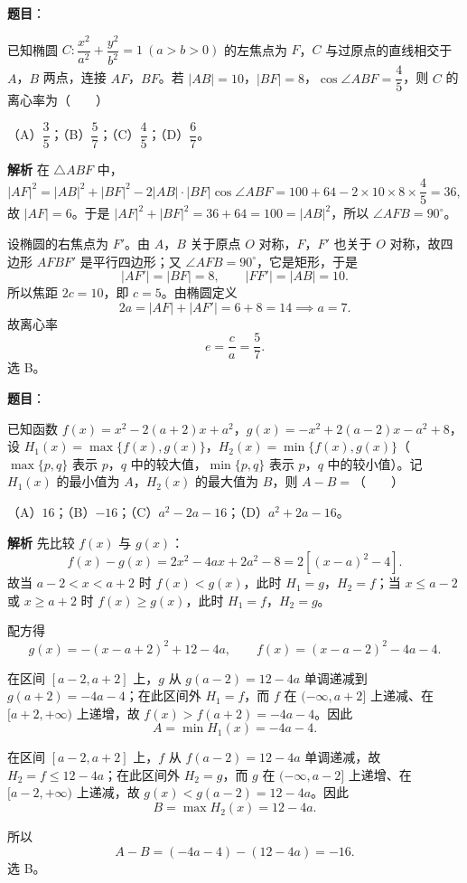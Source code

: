 \begin{answer}

\textbf{题目}：

已知椭圆 $C:\dfrac{x^2}{a^2}+\dfrac{y^2}{b^2}=1\ (a>b>0)$ 的左焦点为 $F$，$C$ 与过原点的直线相交于 $A$，$B$ 两点，连接 $AF$，$BF$。若 $|AB|=10$，$|BF|=8$，$\cos\angle ABF=\dfrac45$，则 $C$ 的离心率为\mbox{（　　）}

（A）$\dfrac35$；（B）$\dfrac57$；（C）$\dfrac45$；（D）$\dfrac67$。

\textbf{解析}
在 $\triangle ABF$ 中，
\nopagebreak[4]
\[|AF|^2=|AB|^2+|BF|^2-2|AB|\cdot|BF|\cos\angle ABF
=100+64-2\times10\times8\times\frac45=36,\]
故 $|AF|=6$。于是 $|AF|^2+|BF|^2=36+64=100=|AB|^2$，所以 $\angle AFB=90^\circ$。

设椭圆的右焦点为 $F'$。由 $A$，$B$ 关于原点 $O$ 对称，$F$，$F'$ 也关于 $O$ 对称，故四边形 $AFBF'$ 是平行四边形；又 $\angle AFB=90^\circ$，它是矩形，于是
\nopagebreak[4]
\[|AF'|=|BF|=8,\qquad |FF'|=|AB|=10.\]
所以焦距 $2c=10$，即 $c=5$。由椭圆定义
\nopagebreak[4]
\[2a=|AF|+|AF'|=6+8=14\implies a=7.\]
故离心率
\nopagebreak[4]
\[e=\frac ca=\frac57.\]
选 B。


\end{answer}
\begin{answer}

\textbf{题目}：

已知函数 $f(x)=x^2-2(a+2)x+a^2$，$g(x)=-x^2+2(a-2)x-a^2+8$，设 $H_1(x)=\max\{f(x),g(x)\}$，$H_2(x)=\min\{f(x),g(x)\}$（$\max\{p,q\}$ 表示 $p$，$q$ 中的较大值，$\min\{p,q\}$ 表示 $p$，$q$ 中的较小值）。记 $H_1(x)$ 的最小值为 $A$，$H_2(x)$ 的最大值为 $B$，则 $A-B=$\mbox{（　　）}

（A）$16$；（B）$-16$；（C）$a^2-2a-16$；（D）$a^2+2a-16$。

\textbf{解析}
先比较 $f(x)$ 与 $g(x)$：
\nopagebreak[4]
\[f(x)-g(x)=2x^2-4ax+2a^2-8=2\left[(x-a)^2-4\right].\]
故当 $a-2<x<a+2$ 时 $f(x)<g(x)$，此时 $H_1=g$，$H_2=f$；当 $x\leqslant a-2$ 或 $x\geqslant a+2$ 时 $f(x)\geqslant g(x)$，此时 $H_1=f$，$H_2=g$。

配方得
\nopagebreak[4]
\[g(x)=-(x-a+2)^2+12-4a,\qquad f(x)=(x-a-2)^2-4a-4.\]

在区间 $[a-2,a+2]$ 上，$g$ 从 $g(a-2)=12-4a$ 单调递减到 $g(a+2)=-4a-4$；在此区间外 $H_1=f$，而 $f$ 在 $(-\infty,a+2]$ 上递减、在 $[a+2,+\infty)$ 上递增，故 $f(x)>f(a+2)=-4a-4$。因此
\nopagebreak[4]
\[A=\min H_1(x)=-4a-4.\]

在区间 $[a-2,a+2]$ 上，$f$ 从 $f(a-2)=12-4a$ 单调递减，故 $H_2=f\leqslant12-4a$；在此区间外 $H_2=g$，而 $g$ 在 $(-\infty,a-2]$ 上递增、在 $[a-2,+\infty)$ 上递减，故 $g(x)<g(a-2)=12-4a$。因此
\nopagebreak[4]
\[B=\max H_2(x)=12-4a.\]

所以
\nopagebreak[4]
\[A-B=(-4a-4)-(12-4a)=-16.\]
选 B。


\end{answer}

